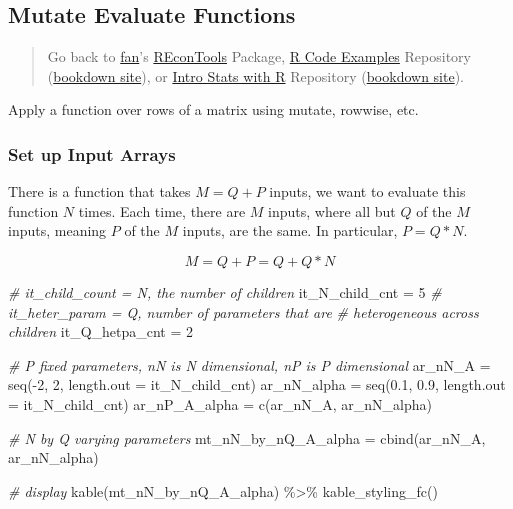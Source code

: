 \documentclass[
]{book}
\newenvironment{Shaded}{\begin{snugshade}}{\end{snugshade}}
\newcommand{\AttributeTok}[1]{\textcolor[rgb]{0.77,0.63,0.00}{#1}}
\newcommand{\CommentTok}[1]{\textcolor[rgb]{0.56,0.35,0.01}{\textit{#1}}}
\newcommand{\DecValTok}[1]{\textcolor[rgb]{0.00,0.00,0.81}{#1}}
\newcommand{\FloatTok}[1]{\textcolor[rgb]{0.00,0.00,0.81}{#1}}
\newcommand{\FunctionTok}[1]{\textcolor[rgb]{0.00,0.00,0.00}{#1}}
\newcommand{\NormalTok}[1]{#1}
\newcommand{\OtherTok}[1]{\textcolor[rgb]{0.56,0.35,0.01}{#1}}
\newcommand{\SpecialCharTok}[1]{\textcolor[rgb]{0.00,0.00,0.00}{#1}}
\begin{document}
\hypertarget{mutate-evaluate-functions}{%
\subsection{Mutate Evaluate Functions}\label{mutate-evaluate-functions}}

\begin{quote}
Go back to \href{http://fanwangecon.github.io/}{fan}'s \href{https://fanwangecon.github.io/REconTools/}{REconTools} Package, \href{https://fanwangecon.github.io/R4Econ/}{R Code Examples} Repository (\href{https://fanwangecon.github.io/R4Econ/bookdown}{bookdown site}), or \href{https://fanwangecon.github.io/Stat4Econ/}{Intro Stats with R} Repository (\href{https://fanwangecon.github.io/Stat4Econ/bookdown}{bookdown site}).
\end{quote}

Apply a function over rows of a matrix using mutate, rowwise, etc.

\hypertarget{set-up-input-arrays-3}{%
\subsubsection{Set up Input Arrays}\label{set-up-input-arrays-3}}

There is a function that takes \(M=Q+P\) inputs, we want to evaluate this function \(N\) times. Each time, there are \(M\) inputs, where all but \(Q\) of the \(M\) inputs, meaning \(P\) of the \(M\) inputs, are the same. In particular, \(P=Q*N\).

\[M = Q+P = Q + Q*N\]

\begin{Shaded}
\begin{Highlighting}[]
\CommentTok{\# it\_child\_count = N, the number of children}
\NormalTok{it\_N\_child\_cnt }\OtherTok{=} \DecValTok{5}
\CommentTok{\# it\_heter\_param = Q, number of parameters that are}
\CommentTok{\# heterogeneous across children}
\NormalTok{it\_Q\_hetpa\_cnt }\OtherTok{=} \DecValTok{2}

\CommentTok{\# P fixed parameters, nN is N dimensional, nP is P dimensional}
\NormalTok{ar\_nN\_A }\OtherTok{=} \FunctionTok{seq}\NormalTok{(}\SpecialCharTok{{-}}\DecValTok{2}\NormalTok{, }\DecValTok{2}\NormalTok{, }\AttributeTok{length.out =}\NormalTok{ it\_N\_child\_cnt)}
\NormalTok{ar\_nN\_alpha }\OtherTok{=} \FunctionTok{seq}\NormalTok{(}\FloatTok{0.1}\NormalTok{, }\FloatTok{0.9}\NormalTok{, }\AttributeTok{length.out =}\NormalTok{ it\_N\_child\_cnt)}
\NormalTok{ar\_nP\_A\_alpha }\OtherTok{=} \FunctionTok{c}\NormalTok{(ar\_nN\_A, ar\_nN\_alpha)}

\CommentTok{\# N by Q varying parameters}
\NormalTok{mt\_nN\_by\_nQ\_A\_alpha }\OtherTok{=} \FunctionTok{cbind}\NormalTok{(ar\_nN\_A, ar\_nN\_alpha)}

\CommentTok{\# display}
\FunctionTok{kable}\NormalTok{(mt\_nN\_by\_nQ\_A\_alpha) }\SpecialCharTok{\%\textgreater{}\%}
  \FunctionTok{kable\_styling\_fc}\NormalTok{()}
\end{Highlighting}
\end{Shaded}
\end{document}
